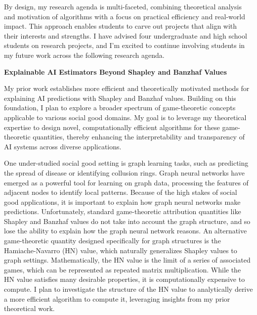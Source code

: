 \documentclass[11pt]{article}
\begin{document}
{By design, my research agenda is multi-faceted, combining theoretical analysis and motivation of algorithms with a focus on practical efficiency and real-world impact. This approach enables students to carve out projects that align with their interests and strengths.
I have advised four undergraduate and high school students on research projects, and I'm excited to continue involving students in my future work across the following research agenda.

{\large \textbf{Explainable AI Estimators Beyond Shapley and Banzhaf Values}}

My prior work establishes more efficient and theoretically motivated methods for explaining AI predictions with Shapley and Banzhaf values.
Building on this foundation, I plan to explore a broader spectrum of game-theoretic concepts applicable to various social good domains. My goal is to leverage my theoretical expertise to design novel, computationally efficient algorithms for these game-theoretic quantities, thereby enhancing the interpretability and transparency of AI systems across diverse applications.

One under-studied social good setting is graph learning tasks, such as predicting the spread of disease or identifying collusion rings.
Graph neural networks have emerged as a powerful tool for learning on graph data, processing the features of adjacent nodes to identify local patterns.
Because of the high stakes of social good applications, it is important to explain how graph neural networks make predictions.
Unfortunately, standard game-theoretic attribution quantities like Shapley and Banzhaf values do not take into account the graph structure, and so lose the ability to explain how the graph neural network reasons.
An alternative game-theoretic quantity designed specifically for graph structures is the Hamiache-Navarro (HN) value, which naturally generalizes Shapley values to graph settings.
Mathematically, the HN value is the limit of a series of associated games, which can be represented as repeated matrix multiplication.
While the HN value satisfies many desirable properties, it is computationally expensive to compute.
I plan to investigate the structure of the HN value to analytically derive a more efficient algorithm to compute it, leveraging insights from my prior theoretical work.

}
\end{document}

